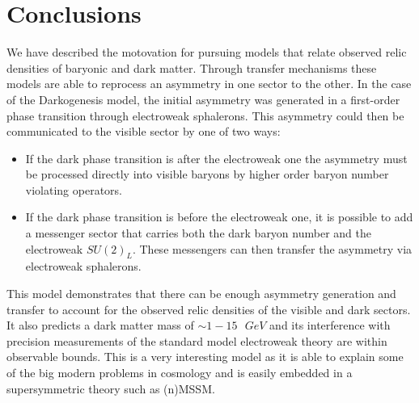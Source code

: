 \section{Conclusions}

We have described the motovation for pursuing models that relate observed relic densities of baryonic and dark matter. Through transfer mechanisms 
these models are able to reprocess an asymmetry in one sector to the other. In the case of the Darkogenesis model, the initial asymmetry was generated
in a first-order phase transition through electroweak sphalerons. This asymmetry could then be communicated to the visible sector by one of two ways: 
\begin{itemize}
  \item If the dark phase transition is after the electroweak one the asymmetry must be processed directly into visible baryons by higher order baryon 
        number violating operators. 
  \item If the dark phase transition is before the electroweak one, it is possible to add a messenger sector that carries both the dark baryon number
        and the electroweak $SU(2)_L$. These messengers can then transfer the asymmetry via electroweak sphalerons.
\end{itemize}

This model demonstrates that there can be enough asymmetry generation and transfer to account for the observed relic densities of the visible and dark sectors.
It also predicts a dark matter mass of $\sim 1-15 \text{ }GeV$ and its interference with precision measurements of the standard model electroweak theory are within
observable bounds. This is a very interesting model as it is able to explain some of the big modern problems in cosmology and is easily embedded in a supersymmetric
theory such as (n)MSSM.

